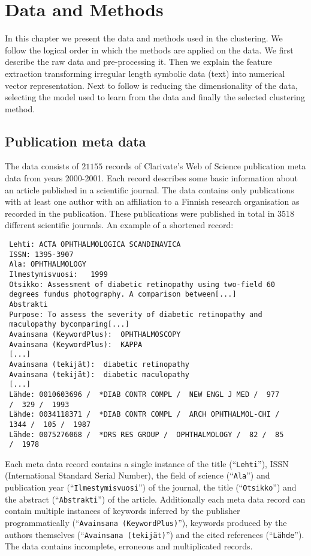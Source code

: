 \chapter{Data and Methods}
\label{chapter:methods}
In this chapter we present the data and methods used in the 
clustering. We follow the logical order in which the methods are 
applied on the data. We first describe the raw data and  
pre-processing it. Then we explain the feature extraction 
transforming irregular length symbolic data (text) into numerical 
vector representation. Next to follow is reducing the 
dimensionality of the data, selecting the model used to learn from 
the data and finally the selected clustering method.

\section{Publication meta data}
\label{section:metadata}
The data consists of $21155$ records of Clarivate's Web of Science 
publication meta data from years 2000-2001. Each record describes some 
basic information about an article published in a scientific 
journal. The data contains only publications with at least one
author with an affiliation to a Finnish research organisation as
recorded in the publication. These publications were published in 
total in $3518$ different scientific journals.
An example of a shortened record:
\begin{verbatim}
 Lehti: ACTA OPHTHALMOLOGICA SCANDINAVICA
 ISSN: 1395-3907
 Ala: OPHTHALMOLOGY
 Ilmestymisvuosi:   1999
 Otsikko: Assessment of diabetic retinopathy using two-field 60 
 degrees fundus photography. A comparison between[...]
 Abstrakti
 Purpose: To assess the severity of diabetic retinopathy and 
 maculopathy bycomparing[...]
 Avainsana (KeywordPlus):  OPHTHALMOSCOPY
 Avainsana (KeywordPlus):  KAPPA
 [...]
 Avainsana (tekijät):  diabetic retinopathy
 Avainsana (tekijät):  diabetic maculopathy
 [...]
 Lähde: 0010603696 /  *DIAB CONTR COMPL /  NEW ENGL J MED /  977 
 /  329 /  1993
 Lähde: 0034118371 /  *DIAB CONTR COMPL /  ARCH OPHTHALMOL-CHI /  
 1344 /  105 /  1987
 Lähde: 0075276068 /  *DRS RES GROUP /  OPHTHALMOLOGY /  82 /  85 
 /  1978
 \end{verbatim}
 
Each meta data record contains a single instance of the title 
(``\texttt{Lehti}''), ISSN (International Standard Serial Number), 
the field of science (``\texttt{Ala}'') and publication year 
(``\texttt{Ilmestymisvuosi}'') of the journal, the title 
(``\texttt{Otsikko}'') and the abstract (``\texttt{Abstrakti}'') 
of the article. Additionally each meta data record can contain
multiple instances of keywords inferred by the publisher programmatically
(``\texttt{Avainsana (KeywordPlus)}''), keywords produced by the 
authors themselves (``\texttt{Avainsana (tekijät)}'') and the 
cited references (``\texttt{Lähde}''). The data contains incomplete,
erroneous and multiplicated records.

